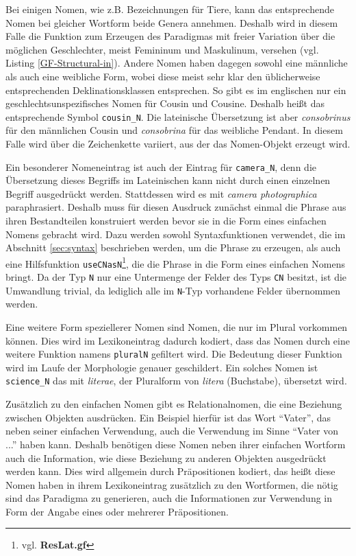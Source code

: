 Bei einigen Nomen, wie z.B. Bezeichnungen für Tiere, kann das entsprechende Nomen bei gleicher Wortform beide Genera annehmen. Deshalb wird in diesem Falle die Funktion zum Erzeugen des Paradigmas mit freier Variation über die möglichen Geschlechter, meist Femininum und Maskulinum, versehen (vgl. Listing \ref{GF-Structural-in}). Andere Nomen haben dagegen sowohl eine männliche als auch eine weibliche Form, wobei diese meist sehr klar den üblicherweise entsprechenden Deklinationsklassen entsprechen. So gibt es im englischen nur ein geschlechtsunspezifisches Nomen für Cousin und Cousine. Deshalb heißt das entsprechende Symbol \texttt{cousin\_N}. Die lateinische Übersetzung ist aber \textit{consobrinus} für den männlichen Cousin und \textit{consobrina} für das weibliche Pendant. In diesem Falle wird über die Zeichenkette variiert, aus der das Nomen-Objekt erzeugt wird.\par 
Ein besonderer Nomeneintrag ist auch der Eintrag für \texttt{camera\_N}, denn die Übersetzung dieses Begriffs im Lateinischen kann nicht durch einen einzelnen Begriff ausgedrückt werden. Stattdessen wird es mit \textit{camera photographica} paraphrasiert. Deshalb muss für diesen Ausdruck zunächst einmal die Phrase aus ihren Bestandteilen konstruiert werden bevor sie in die Form eines einfachen Nomens gebracht wird. Dazu werden sowohl Syntaxfunktionen verwendet, die im Abschnitt  \ref{sec:syntax} beschrieben werden, um die Phrase zu erzeugen, als auch eine Hilfsfunktion \texttt{useCNasN}\footnote{vgl. \textbf{ResLat.gf}}, die die Phrase in die Form eines einfachen Nomens bringt. Da der Typ \texttt{N} nur eine Untermenge der Felder des Typs \texttt{CN} besitzt, ist die Umwandlung trivial, da lediglich alle im \texttt{N}-Typ vorhandene Felder übernommen werden.\par
Eine weitere Form speziellerer Nomen sind Nomen, die nur im Plural vorkommen können. Dies wird im Lexikoneintrag dadurch kodiert, dass das Nomen durch eine weitere Funktion namens \texttt{pluralN} gefiltert wird. Die Bedeutung dieser Funktion wird im Laufe der Morphologie genauer geschildert. Ein solches Nomen ist \texttt{science\_N} das mit \textit{literae}, der Pluralform von \textit{litera} (Buchstabe), übersetzt wird. \par
Zusätzlich zu den einfachen Nomen gibt es Relationalnomen, die eine Beziehung zwischen Objekten ausdrücken. Ein Beispiel hierfür ist das Wort "`Vater"', das neben seiner einfachen Verwendung, auch die Verwendung im Sinne ``Vater von ...'' haben kann. Deshalb benötigen diese Nomen neben ihrer einfachen Wortform auch die Information, wie diese Beziehung zu anderen Objekten ausgedrückt werden kann. Dies wird allgemein durch Präpositionen kodiert, das heißt diese Nomen haben in ihrem Lexikoneintrag zusätzlich zu den Wortformen, die nötig sind das Paradigma zu generieren, auch die Informationen zur Verwendung in Form der Angabe eines oder mehrerer Präpositionen. \par
